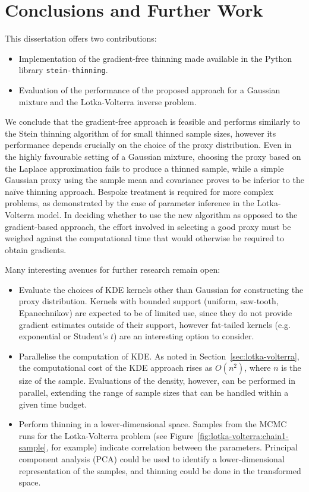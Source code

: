 \documentclass[11pt,a4paper]{report}
\begin{document}
\chapter{Conclusions and Further Work}
\label{sec:conclusions}

This dissertation offers two contributions:
\begin{itemize}
\item Implementation of the gradient-free thinning made available in the Python library \texttt{stein-thinning}.
\item Evaluation of the performance of the proposed approach for a Gaussian mixture and the Lotka-Volterra inverse problem.
\end{itemize}

We conclude that the gradient-free approach is feasible and performs similarly to the Stein thinning algorithm of \cite{riabizOptimalThinningMCMC2022} for small thinned sample sizes, however its performance depends crucially on the choice of the proxy distribution. Even in the highly favourable setting of a Gaussian mixture, choosing the proxy based on the Laplace approximation fails to produce a thinned sample, while a simple Gaussian proxy using the sample mean and covariance proves to be inferior to the na\"ive thinning approach. Bespoke treatment is required for more complex problems, as demonstrated by the case of parameter inference in the Lotka-Volterra model. In deciding whether to use the new algorithm as opposed to the gradient-based approach, the effort involved in selecting a good proxy must be weighed against the computational time that would otherwise be required to obtain gradients.

Many interesting avenues for further research remain open:
\begin{itemize}
\item Evaluate the choices of KDE kernels other than Gaussian for constructing the proxy distribution. Kernels with bounded support (uniform, saw-tooth, Epanechnikov) are expected to be of limited use, since they do not provide gradient estimates outside of their support, however fat-tailed kernels (e.g. exponential or Student's $t$) are an interesting option to consider.
\item Parallelise the computation of KDE. As noted in Section~\ref{sec:lotka-volterra}, the computational cost of the KDE approach rises as $O(n^2)$, where $n$ is the size of the sample. Evaluations of the density, however, can be performed in parallel, extending the range of sample sizes that can be handled within a given time budget.
\item Perform thinning in a lower-dimensional space. Samples from the MCMC runs for the Lotka-Volterra problem (see Figure~\ref{fig:lotka-volterra:chain1-sample}, for example) indicate correlation between the parameters. Principal component analysis (PCA) could be used to identify a lower-dimensional representation of the samples, and thinning could be done in the transformed space.
\end{itemize}
\end{document}
